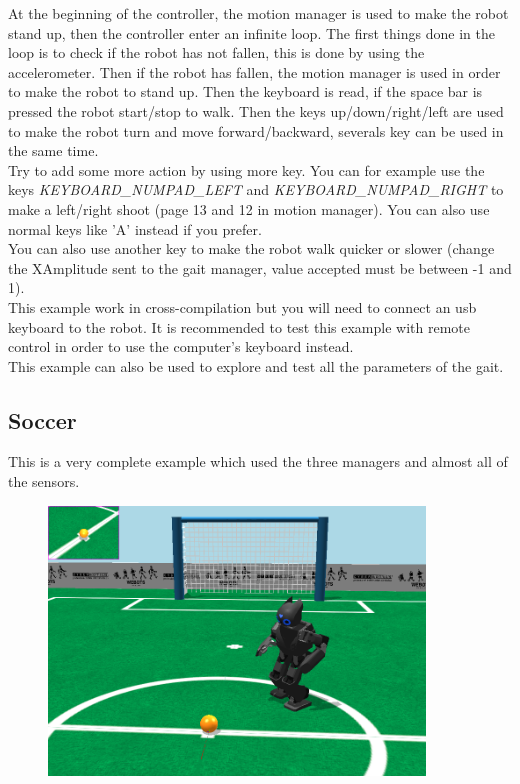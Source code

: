 \documentclass[a4paper, 12pt]{article}  		%
\begin{document}
At the beginning of the controller, the motion manager is used to make the robot stand up, then the controller enter an infinite loop.
The first things done in the loop is to check if the robot has not fallen, this is done by using the accelerometer. Then if the robot has fallen, the motion manager is used in order to make the robot to stand up. 
Then the keyboard is read, if the space bar is pressed the robot start/stop to walk.
Then the keys up/down/right/left are used to make the robot turn and move forward/backward, severals key can be used in the same time.\\

Try to add some more action by using more key. You can for example use the keys \textit{KEYBOARD\_NUMPAD\_LEFT} and \textit{KEYBOARD\_NUMPAD\_RIGHT} to make a left/right shoot (page 13 and 12 in motion manager). You can also use normal keys like 'A' instead if you prefer.\\

You can also use another key to make the robot walk quicker or slower (change the XAmplitude sent to the gait manager, value accepted must be between -1 and 1).\\

This example work in cross-compilation but you will need to connect an usb keyboard to the robot. It is recommended to test this example with remote control in order to use the computer's keyboard instead.\\

This example can also be used to explore and test all the parameters of the gait.\\

\newpage
\subsection{Soccer}

This is a very complete example which used the three managers and almost all of the sensors.\\

\begin{figure}[H]
\begin{center}
\includegraphics[width=10cm]{example_sample.png}
\label{example_sample.png}
\end{center}
\end{figure}
\end{document}
